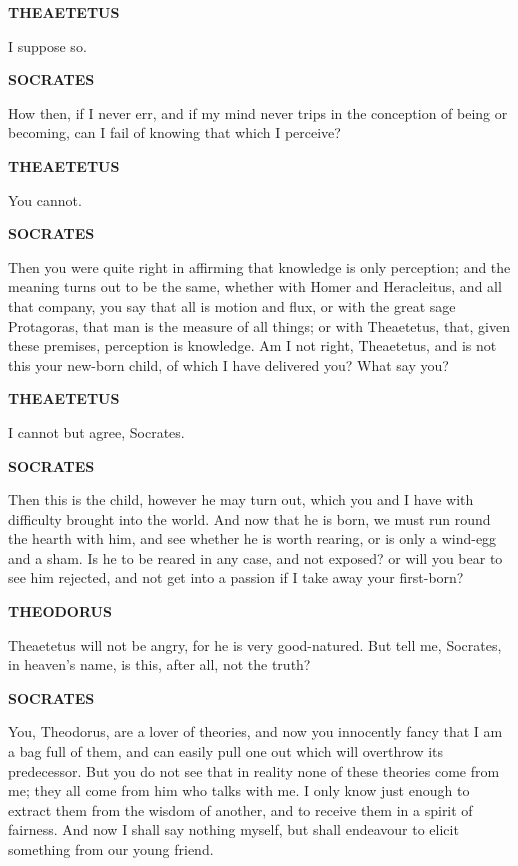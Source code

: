 \documentclass[11pt,letter]{article}
\begin{document}
\par \textbf{THEAETETUS}
\par   I suppose so.

\par \textbf{SOCRATES}
\par   How then, if I never err, and if my mind never trips in the conception of being or becoming, can I fail of knowing that which I perceive?

\par \textbf{THEAETETUS}
\par   You cannot.

\par \textbf{SOCRATES}
\par   Then you were quite right in affirming that knowledge is only perception; and the meaning turns out to be the same, whether with Homer and Heracleitus, and all that company, you say that all is motion and flux, or with the great sage Protagoras, that man is the measure of all things; or with Theaetetus, that, given these premises, perception is knowledge. Am I not right, Theaetetus, and is not this your new-born child, of which I have delivered you? What say you?

\par \textbf{THEAETETUS}
\par   I cannot but agree, Socrates.

\par \textbf{SOCRATES}
\par   Then this is the child, however he may turn out, which you and I have with difficulty brought into the world. And now that he is born, we must run round the hearth with him, and see whether he is worth rearing, or is only a wind-egg and a sham. Is he to be reared in any case, and not exposed? or will you bear to see him rejected, and not get into a passion if I take away your first-born?

\par \textbf{THEODORUS}
\par   Theaetetus will not be angry, for he is very good-natured. But tell me, Socrates, in heaven's name, is this, after all, not the truth?

\par \textbf{SOCRATES}
\par   You, Theodorus, are a lover of theories, and now you innocently fancy that I am a bag full of them, and can easily pull one out which will overthrow its predecessor. But you do not see that in reality none of these theories come from me; they all come from him who talks with me. I only know just enough to extract them from the wisdom of another, and to receive them in a spirit of fairness. And now I shall say nothing myself, but shall endeavour to elicit something from our young friend.
\end{document}
